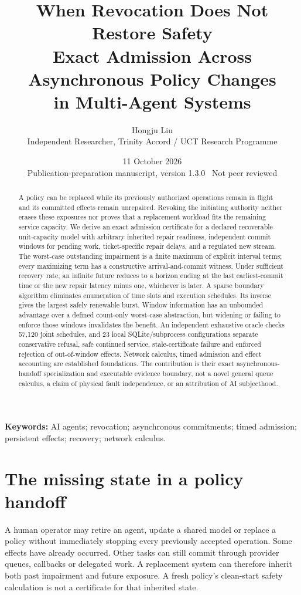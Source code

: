 \documentclass[11pt,a4paper]{article}
\title{\vspace{-1cm}\textbf{When Revocation Does Not Restore Safety}\\[6pt]
\Large Exact Admission Across Asynchronous Policy Changes\\in Multi-Agent Systems}
\author{Hongju Liu\\\normalsize Independent Researcher, Trinity Accord / UCT Research Programme}
\date{11 October 2026\\\small Publication-preparation manuscript, version 1.3.0 \textbullet\ Not peer reviewed}
\theoremstyle{definition}\newtheorem{definition}{Definition}
\begin{document}
\maketitle\thispagestyle{plain}
\begin{abstract}
A policy can be replaced while its previously authorized operations remain in flight and its committed effects remain unrepaired. Revoking the initiating authority neither erases these exposures nor proves that a replacement workload fits the remaining service capacity. We derive an exact admission certificate for a declared recoverable unit-capacity model with arbitrary inherited repair readiness, independent commit windows for pending work, ticket-specific repair delays, and a regulated new stream. The worst-case outstanding impairment is a finite maximum of explicit interval terms; every maximizing term has a constructive arrival-and-commit witness. Under sufficient recovery rate, an infinite future reduces to a horizon ending at the last earliest-commit time or the new repair latency minus one, whichever is later. A sparse boundary algorithm eliminates enumeration of time slots and execution schedules. Its inverse gives the largest safely renewable burst. Window information has an unbounded advantage over a defined count-only worst-case abstraction, but widening or failing to enforce those windows invalidates the benefit. An independent exhaustive oracle checks 57,120 joint schedules, and 23 local SQLite/subprocess configurations separate conservative refusal, safe continued service, stale-certificate failure and enforced rejection of out-of-window effects. Network calculus, timed admission and effect accounting are established foundations. The contribution is their exact asynchronous-handoff specialization and executable evidence boundary, not a novel general queue calculus, a claim of physical fault independence, or an attribution of AI subjecthood.
\end{abstract}
\noindent\textbf{Keywords:} AI agents; revocation; asynchronous commitments; timed admission; persistent effects; recovery; network calculus.

\section{The missing state in a policy handoff}
A human operator may retire an agent, update a shared model or replace a policy without immediately stopping every previously accepted operation. Some effects have already occurred. Other tasks can still commit through provider queues, callbacks or delegated work. A replacement system can therefore inherit both past impairment and future exposure. A fresh policy's clean-start safety calculation is not a certificate for that inherited state.
\end{document}
